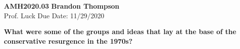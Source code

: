 \noindent
\textbf{AMH2020.03} \hfill \textbf{Brandon Thompson} \\
\normalsize Prof. Luck \hfill Due Date: 11/29/2020 \\

\begin{center}
\textbf{What were some of the groups and ideas that lay at the base of the conservative resurgence in the 1970s?}
\end{center}